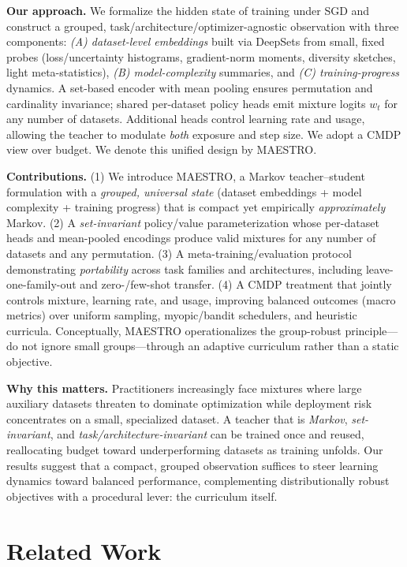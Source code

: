 \documentclass[11pt]{article}
\newcommand{\1}{\mathbf{1}}
\newcommand{\MAESTRO}{\textsc{MAESTRO}\xspace}
\begin{document}
\textbf{Our approach.} We formalize the hidden state of training under SGD and construct a grouped, task/architecture/optimizer-agnostic observation with three components: \emph{(A) dataset-level embeddings} built via DeepSets from small, fixed probes (loss/uncertainty histograms, gradient-norm moments, diversity sketches, light meta-statistics), \emph{(B) model-complexity} summaries, and \emph{(C) training-progress} dynamics. A set-based encoder with mean pooling ensures permutation and cardinality invariance; shared per-dataset policy heads emit mixture logits $w_t$ for any number of datasets. Additional heads control learning rate and usage, allowing the teacher to modulate \emph{both} exposure and step size. We adopt a CMDP view over budget. We denote this unified design by \MAESTRO{}. 

\textbf{Contributions.} (1) We introduce \MAESTRO{}, a Markov teacher--student formulation with a \emph{grouped, universal state} (dataset embeddings + model complexity + training progress) that is compact yet empirically \emph{approximately} Markov. (2) A \emph{set-invariant} policy/value parameterization whose per-dataset heads and mean-pooled encodings produce valid mixtures for any number of datasets and any permutation. (3) A meta-training/evaluation protocol demonstrating \emph{portability} across task families and architectures, including leave-one-family-out and zero-/few-shot transfer. (4) A CMDP treatment that jointly controls mixture, learning rate, and usage, improving balanced outcomes (macro metrics) over uniform sampling, myopic/bandit schedulers, and heuristic curricula. Conceptually, \MAESTRO{} operationalizes the group-robust principle—do not ignore small groups—through an adaptive curriculum rather than a static objective.

\textbf{Why this matters.} Practitioners increasingly face mixtures where large auxiliary datasets threaten to dominate optimization while deployment risk concentrates on a small, specialized dataset. A teacher that is \emph{Markov}, \emph{set-invariant}, and \emph{task/architecture-invariant} can be trained once and reused, reallocating budget toward underperforming datasets as training unfolds. Our results suggest that a compact, grouped observation suffices to steer learning dynamics toward balanced performance, complementing distributionally robust objectives with a procedural lever: the curriculum itself.

\section{Related Work}
\end{document}
